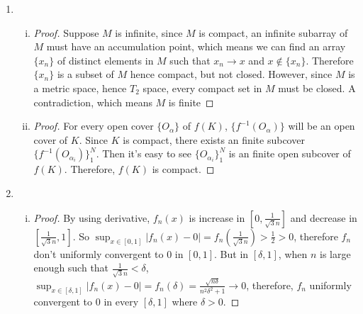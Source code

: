 \documentclass[11pt]{article}
\begin{document}
\begin{enumerate}[1]
\begin{enumerate}[(i)]
\begin{proof}
		\end{proof}
		\item
		\begin{enumerate}[(a)]
			\item $\cap_{n=1}^\infty (0, 1 + \frac{1}{n}) = (0 , 1]$ which is not open.
			\item $\{(x,x^2): x \in [0,1]\} \cap \{(x,x): x \in [0,1]\} = \{(0,0),(1,1)\}$ which is
			not connected. 
		\end{enumerate}
	\end{enumerate}
	\item
	\begin{enumerate}[(i)]
		\item 
		\begin{proof}
			Suppose $M$ is infinite, since $M$ is compact, an infinite subarray of $M$ must have an accumulation point, which means we can find an array $\{x_n\}$ of distinct elements in $M$
			such that $x_n \to x$ and $x \notin \{x_n\}$. Therefore $\{x_n\}$ is a subset of $M$ hence compact, but not closed. However, since $M$ is a metric space, hence $T_2$ space, every compact set in $M$ must be closed. A contradiction, which means $M$ is finite
		\end{proof}
		\item 
		\begin{proof}
			For every open cover $\{O_\alpha\}$ of $f(K)$, $\{f^{-1}(O_\alpha)\}$ will be an open
			cover of $K$. Since $K$ is compact, there exists an finite subcover $\{f^{-1}(O_{\alpha_i})\}_1^N$. Then it's easy to see $\{O_{\alpha_i}\}_1^N$ is an finite open subcover of $f(K)$. Therefore, $f(K)$ is compact.
		\end{proof}
	\end{enumerate}
	\item 
	\begin{enumerate}[(i)]
		\item
		\begin{proof}
			By using derivative, $f_n(x)$ is increase in $[0, \frac{1}{\sqrt{3} n}]$ and decrease in
			$[\frac{1}{\sqrt{3} n}, 1]$. So $\sup_{x\in[0,1]} |f_n(x) - 0| = f_n(\frac{1}{\sqrt{3} n}) > \frac{1}{2} > 0$, therefore $f_n$ don't uniformly convergent to $0$ in $[0,1]$. But in $[\delta,1]$, when $n$ is large enough such that $\frac{1}{\sqrt{3} n} < \delta$, $\sup_{x\in[\delta,1]} |f_n(x) - 0| = f_n(\delta) = \frac{\sqrt{n \delta}}{n^2 \delta^2 + 1} \to 0$, therefore, $f_n$ uniformly convergent to $0$ in every $[\delta, 1]$ where $\delta > 0$.
		\end{proof}

\end{enumerate}
\end{enumerate}
\end{document}
